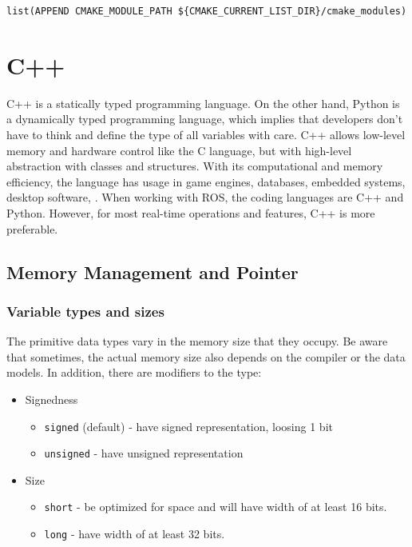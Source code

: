 \verb|list(APPEND CMAKE_MODULE_PATH ${CMAKE_CURRENT_LIST_DIR}/cmake_modules)|

\section{C++}
C++ is a statically typed programming language. On the other hand, Python is a dynamically typed programming language, which implies that developers don't have to think and define the type of all variables with care. C++ allows low-level memory and hardware control like the C language, but with high-level abstraction with classes and structures. With its computational and memory efficiency, the language has usage in game engines, databases, embedded systems, desktop software, \etc. When working with \ac{ROS}, the coding languages are C++ and Python. However, for most real-time operations and features, C++ is more preferable.

\subsection{Memory Management and Pointer}

\subsubsection{Variable types and sizes}

The primitive data types vary in the memory size that they occupy. Be aware that sometimes, the actual memory size also depends on the compiler or the data models. In addition, there are modifiers to the type:

\begin{itemize}
	\setlength\itemsep{0em}
	\item Signedness
	 \begin{itemize}
	 	\setlength\itemsep{0em}
		\item \verb|signed| (default) - have signed representation, loosing 1 bit
		\item \verb|unsigned| - have unsigned representation
	\end{itemize}
	\item Size \begin{itemize}
		\setlength\itemsep{0em}
		\item \verb|short| - be optimized for space and will have width of at least 16 bits.
		\item \verb|long| - have width of at least 32 bits.	
	\end{itemize}
\end{itemize}

